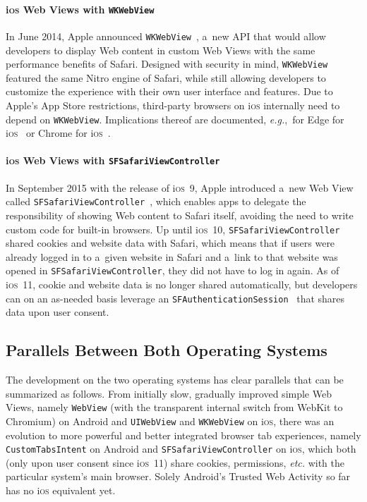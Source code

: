 \documentclass[sigconf,hyphens]{acmart}
\begin{document}
\paragraph{i\textsc{os} Web Views with \texttt{WKWebView}}

In June 2014, Apple announced \texttt{WKWebView}~\cite{apple2018wkwebview},
a~new API that would allow developers
to display Web content in custom Web Views with the same performance benefits of Safari.
Designed with security in mind, \texttt{WKWebView} featured the same Nitro engine of Safari,
while still allowing developers to customize the experience
with their own user interface and features.
Due to Apple's App Store restrictions, third-party browsers on i\textsc{os}
internally need to depend on \texttt{WKWebView}.
Implications thereof are documented,
\emph{e.g.},\ for Edge for i\textsc{os}~\cite{lyndersay2017edge}
or Chrome for i\textsc{os}~\cite{chromiumblog2016chrome}.

\paragraph{i\textsc{os} Web Views with \texttt{SFSafariViewController}}

In September 2015 with the release of i\textsc{os}~9, Apple introduced a~new Web View called
\texttt{SFSafariViewController}~\cite{apple2018sfsafariviewcontroller},
which enables apps to delegate the responsibility of showing Web content to Safari itself,
avoiding the need to write custom code for built-in browsers.
Up until i\textsc{os}~10, \texttt{SFSafariViewController}
shared cookies and website data with Safari,
which means that if users were already logged in to a~given website in Safari
and a~link to that website was opened in \texttt{SFSafariViewController},
they did not have to log in again.
As of i\textsc{os}~11, cookie and website data is no longer shared automatically,
but developers can on an as-needed basis leverage
an \texttt{SFAuthenticationSession}~\cite{apple2018sfauthenticationsession}
that shares data upon user consent. 

\subsection{Parallels Between Both Operating Systems}

The development on the two operating systems has clear parallels
that can be summarized as follows.
From initially slow, gradually improved simple Web Views, namely \texttt{WebView}
(with the transparent internal switch from WebKit to Chromium)
on Android and \texttt{UIWebView} and \texttt{WKWebView} on i\textsc{os},
there was an evolution to more powerful and better integrated browser tab experiences,
namely \texttt{CustomTabsIntent} on Android and
\texttt{SFSafariViewController} on i\textsc{os},
which both (only upon user consent since i\textsc{os}~11)
share cookies, permissions, \emph{etc.}
with the particular system's main browser.
Solely Android's Trusted Web Activity so far has no i\textsc{os} equivalent yet.
\end{document}
